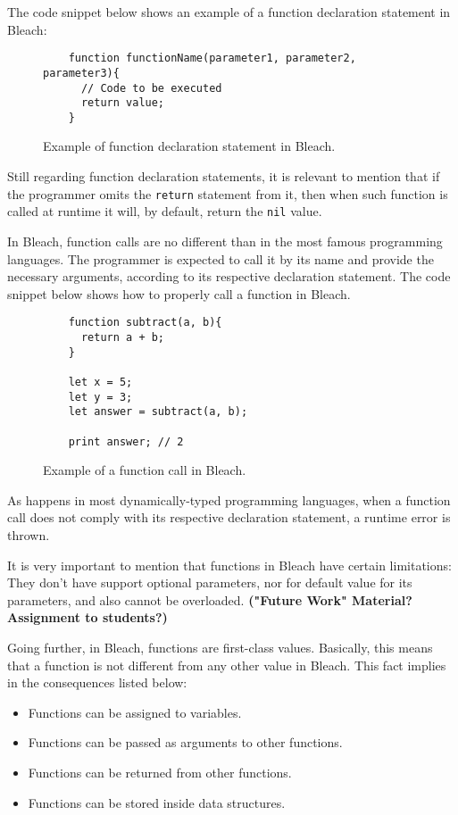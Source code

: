 The code snippet below shows an example of a function declaration statement in Bleach:

\begin{figure}[H]
    \centering
    \begin{lstlisting}
    function functionName(parameter1, parameter2, parameter3){
      // Code to be executed
      return value;
    }
    \end{lstlisting}
    \caption{Example of function declaration statement in Bleach.}
\end{figure}

Still regarding function declaration statements, it is relevant to mention that if the programmer omits the \texttt{return} statement from it, then when such function is called at runtime it will, by default, return the \texttt{nil} value.

In Bleach, function calls are no different than in the most famous programming languages. The programmer is expected to call it by its name and provide the necessary arguments, according to its respective declaration statement. The code snippet below shows how to properly call a function in Bleach.

\begin{figure}[H]
    \centering
    \begin{lstlisting}
    function subtract(a, b){
      return a + b;
    }

    let x = 5;
    let y = 3;
    let answer = subtract(a, b);
    
    print answer; // 2
    \end{lstlisting}
    \caption{Example of a function call in Bleach.}
\end{figure}

As happens in most dynamically-typed programming languages, when a function call does not comply with its respective declaration statement, a runtime error is thrown.

It is very important to mention that functions in Bleach have certain limitations: They don't have support optional parameters, nor for default value for its parameters, and also cannot be overloaded. \textbf{("Future Work" Material? Assignment to students?)}

Going further, in Bleach, functions are first-class values. Basically, this means that a function is not different from any other value in Bleach. This fact implies in the consequences listed below:

\begin{itemize}
    \item Functions can be assigned to variables.
    \item Functions can be passed as arguments to other functions.
    \item Functions can be returned from other functions.
    \item Functions can be stored inside data structures.
\end{itemize}

